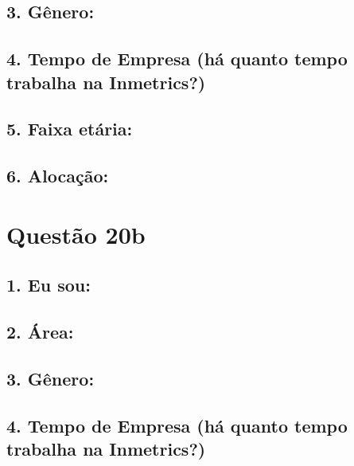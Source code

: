 \documentclass[]{book}
\begin{document}
\hypertarget{genero-53}{%
\subsection{3. Gênero:}\label{genero-53}}

\hypertarget{tempo-de-empresa-ha-quanto-tempo-trabalha-na-inmetrics-53}{%
\subsection{4. Tempo de Empresa (há quanto tempo trabalha na Inmetrics?)}\label{tempo-de-empresa-ha-quanto-tempo-trabalha-na-inmetrics-53}}

\hypertarget{faixa-etaria-53}{%
\subsection{5. Faixa etária:}\label{faixa-etaria-53}}

\hypertarget{alocacao-53}{%
\subsection{6. Alocação:}\label{alocacao-53}}

\hypertarget{questao-20b}{%
\section{Questão 20b}\label{questao-20b}}

\hypertarget{eu-sou-54}{%
\subsection{1. Eu sou:}\label{eu-sou-54}}

\hypertarget{area-54}{%
\subsection{2. Área:}\label{area-54}}

\hypertarget{genero-54}{%
\subsection{3. Gênero:}\label{genero-54}}

\hypertarget{tempo-de-empresa-ha-quanto-tempo-trabalha-na-inmetrics-54}{%
\subsection{4. Tempo de Empresa (há quanto tempo trabalha na Inmetrics?)}\label{tempo-de-empresa-ha-quanto-tempo-trabalha-na-inmetrics-54}}
\end{document}
